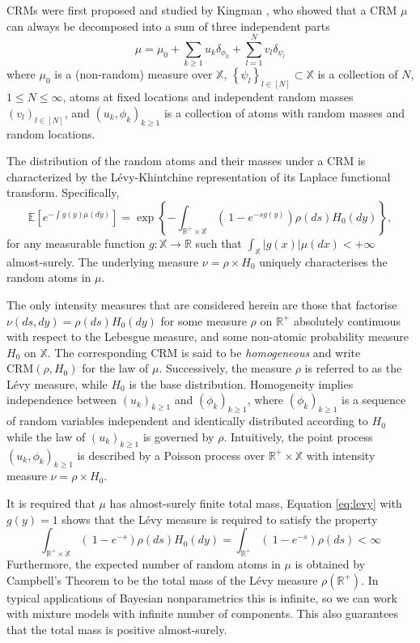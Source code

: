 \gls{CRM}s were first proposed and studied by Kingman \cite{Kingman:1967kn}, who showed that a \gls{CRM} $\mu$ can always be decomposed into a sum of three independent parts
$$ \mu = \mu_0 + \sum_{k \ge 1}{u_k \delta_{\phi_k}} + \sum_{l=1}^N{v_l \delta_{\psi_l}} $$
where $\mu_0$ is a (non-random) measure over $\mathbb{X}$, $\left\{ \psi_l \right\}_{l \in [N]} \subset  \mathbb{X}$ is a collection of $N$, $1 \le N \le \infty$, atoms at fixed locations and independent random masses $\left(v_l \right)_{l \in [N]}$, and $\left( u_k, \phi_k \right)_{k \ge 1}$ is a collection of atoms with random masses and random locations.

The distribution of the random atoms and their masses under a \gls{CRM} is characterized by the Lévy-Khintchine representation of its Laplace functional transform. Specifically,
\begin{equation} \label{eq:levy}
\mathbb{E} \left[e^{-\int g(y)\mu(dy)} \right] = \exp \left\{ - \int_{\mathbb{R}^+ \times \mathbb{X}} \left( \  1 - e^{-sg(y)} \right) \rho(ds) H_0(dy) \right\},
\end{equation}
for any measurable function $g: \mathbb{X} \rightarrow \mathbb{R}$ such that $\int_{\mathbb{X}}|g(x)|\mu(dx)<+ \infty$ almost-surely.
The underlying measure $\nu = \rho \times H_0$ uniquely characterises the random atoms in $\mu$.

The only intensity measures that are considered herein are those that factorise $\nu(ds, dy) = \rho(ds)H_0(dy)$ for some measure $\rho$ on $\mathbb{R}^+$ absolutely continuous with respect to the Lebesgue measure, and some non-atomic probability measure $H_0$ on $\mathbb{X}$. The corresponding \gls{CRM} is said to be \textit{homogeneous} and write $\text{CRM}(\rho, H_0)$ for the law of $\mu$. Successively, the measure $\rho$ is referred to as the Lévy measure, while $H_0$ is the base distribution.
Homogeneity implies independence between $\left(u_k \right)_{k\ge1}$ and $\left(\phi_k \right)_{k\ge1}$, where $\left(\phi_k \right)_{k\ge1}$ is a sequence of random variables independent and identically distributed according to $H_0$ while the law of $\left(u_k \right)_{k\ge1}$  is governed by $\rho$. Intuitively, the point process $\left(u_k, \phi_k \right)_{k\ge1}$  is described by a Poisson process over $\mathbb{R}^+ \times \mathbb{X}$ with intensity measure $\nu = \rho \times H_0$.

It is required that $\mu$ has almost-surely finite total mass, Equation \ref{eq:levy} with $g(y)=1$ shows that the Lévy measure is required to satisfy the property
$$ \int_{\mathbb{R}^+ \times \mathbb{X}} \left( \  1 - e^{-s} \right) \rho(ds) H_0(dy) = 
\int_{\mathbb{R}^+} \left( \  1 - e^{-s} \right) \rho(ds) < \infty $$
Furthermore, the expected number of random atoms in $\mu$ is obtained by Campbell’s Theorem to be the total mass of the Lévy measure $\rho(\mathbb{R}^+)$. In typical applications of Bayesian nonparametrics this is infinite, so we can work with mixture models with infinite number of components. This also guarantees that the total mass is positive almost-surely. \\

